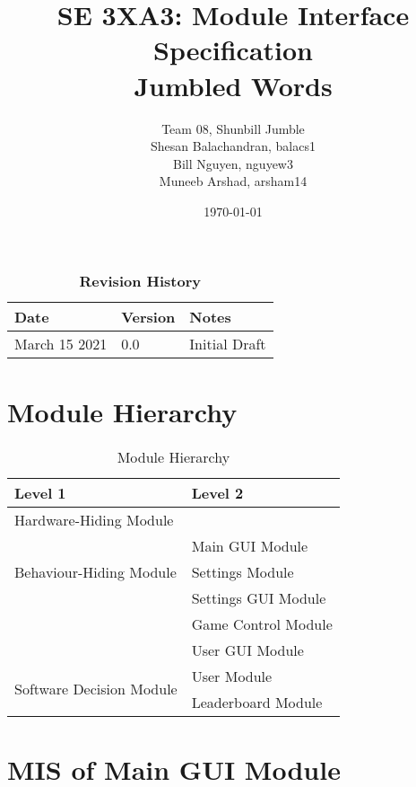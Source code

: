 \documentclass[12,english]{article}
\title{SE 3XA3: Module Interface Specification\\Jumbled Words}
\author{Team 08, Shunbill Jumble
	\\Shesan Balachandran, balacs1
	\\Bill Nguyen, nguyew3
	\\Muneeb Arshad, arsham14
}
\date{\today}
\begin{document}
\maketitle
\clearpage

\begin{table}[bp]
	\caption{\bf Revision History}
	\begin{tabularx}{\textwidth}{p{3cm}p{2cm}X}
		\toprule {\bf Date} & {\bf Version} & {\bf Notes}\\
		\midrule
		March 15 2021 & 0.0 & Initial Draft\\
		\bottomrule
	\end{tabularx}
\end{table}


\clearpage

\tableofcontents
\newpage

\section{Module Hierarchy}
\begin{table}[ht!]
\centering
\begin{tabular}{p{} p{}}
\toprule
\textbf{Level 1} & \textbf{Level 2}\\
\midrule

{Hardware-Hiding Module} & ~ \\
\midrule

\multirow{3}{0.3\textwidth}{Behaviour-Hiding Module}
& Main GUI Module \\
& Settings Module \\ %
& Settings GUI Module \\ %
& Game Control Module \\ %
& User GUI Module \\ %


\midrule

\multirow{3}{0.3\textwidth}{Software Decision Module} 
& User Module\\ %
& Leaderboard Module\\ %
\bottomrule

\end{tabular}
\caption{Module Hierarchy}
\label{TblMH}
\end{table}

\section{MIS of Main GUI Module}
\end{document}
